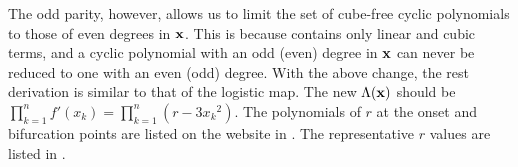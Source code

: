 \documentclass{ws-ijbc}
\begin{document}
The odd parity, however, allows us to limit
  the set of cube-free cyclic polynomials
  to those of even degrees in $\mathbf{x}$.
%
This is because  contains only linear and cubic terms,
and a cyclic polynomial with an odd (even) degree in $\mathbf{x}$
can never be reduced to one with an even (odd) degree.
%
%
%
%
%
%
With the above change, the rest derivation is similar to that of the logistic map.
The new $\Lambda(\mathbf{x})$ should be
$\prod_{k=1}^n f'(x_k) = \prod_{k=1}^n (r - 3 {x_k}^2)$.
%
The polynomials of $r$
  at the onset and bifurcation points
  are listed on the website in .
%
The representative $r$ values are listed in .
%
\end{document}
